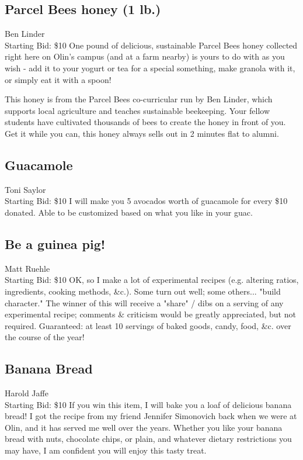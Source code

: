 \documentclass[11pt]{article}
\begin{document}
\subsection{Parcel Bees honey (1 lb.)}
Ben Linder
\\
Starting Bid: \$10
\newline
One pound of delicious, sustainable Parcel Bees honey collected right here on Olin's campus (and at a farm nearby) is yours to do with as you wish - add it to your yogurt or tea for a special something, make granola with it, or simply eat it with a spoon! 

This honey is from the Parcel Bees co-curricular run by Ben Linder, which supports local agriculture and teaches sustainable beekeeping. Your fellow students have cultivated thousands of bees to create the honey in front of you. Get it while you can, this honey always sells out in 2 minutes flat to alumni.
\subsection{Guacamole}
Toni Saylor
\\
Starting Bid: \$10
\newline
I will make you 5 avocados worth of guacamole for every \$10 donated. Able to be customized based on what you like in your guac.
\subsection{Be a guinea pig!}
Matt Ruehle
\\
Starting Bid: \$10
\newline
OK, so I make a lot of experimental recipes (e.g. altering ratios, ingredients, cooking methods, \&c.). Some turn out well; some others... "build character."
The winner of this will receive a "share" / dibs on a serving of any experimental recipe; comments \& criticism would be greatly appreciated, but not required.
Guaranteed: at least 10 servings of baked goods, candy, food, \&c. over the course of the year!
\subsection{Banana Bread}
Harold Jaffe
\\
Starting Bid: \$10
\newline
If you win this item, I will bake you a loaf of delicious banana bread! I got the recipe from my friend Jennifer Simonovich back when we were at Olin, and it has served me well over the years. Whether you like your banana bread with nuts, chocolate chips, or plain, and whatever dietary restrictions you may have, I am confident you will enjoy this tasty treat.
\end{document}
